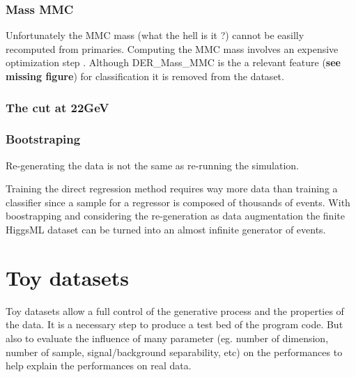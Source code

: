 \subsubsection{Mass MMC} %
\label{ssub:mass_mmc}

Unfortunately the MMC mass (what the hell is it ?) cannot be easilly recomputed from primaries.
Computing the MMC mass involves an expensive optimization step .
Although DER\_Mass\_MMC is the a relevant feature (\textbf{see missing figure}) for classification it is removed from the dataset.





\subsubsection{The cut at 22GeV} %
\label{ssub:the_cut}






\subsubsection{Bootstraping} %
\label{ssub:boostraping}


Re-generating the data is not the same as re-running the simulation.

Training the direct regression method requires way more data than training a classifier since a sample for a regressor is composed of thousands of events.
With boostrapping and considering the re-generation as data augmentation the finite HiggsML dataset can be turned into an almost infinite generator of events.












\section{Toy datasets} %
\label{sec:toy_datasets}


Toy datasets allow a full control of the generative process and the properties of the data.
It is a necessary step to produce a test bed of the program code.
But also to evaluate the influence of many parameter (eg. number of dimension, number of sample, signal/background separability, etc) on the performances to help explain the performances on real data.






